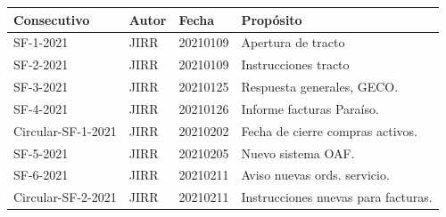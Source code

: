 \documentclass[12pt]{article}
\begin{document}
    

\begin{table}[]
\centering
\begin{tabular}{@{}llll@{}}
\toprule
Consecutivo & Autor & Fecha & Propósito \\ 
\midrule
      SF-1-2021      &JIRR     &20210109       &Apertura de tracto \\
      SF-2-2021      &JIRR     &20210109       &Instrucciones tracto \\ 
      SF-3-2021      &JIRR     &20210125       &Respuesta generales, GECO. \\ 
      SF-4-2021      &JIRR     &20210126       &Informe facturas Paraíso. \\ 
      Circular-SF-1-2021      &JIRR     &20210202       &Fecha de cierre compras activos. \\ 
      SF-5-2021      &JIRR     &20210205 &Nuevo sistema OAF. \\ 
      SF-6-2021      &JIRR     &20210211 &Aviso nuevas ords. servicio. \\ 
      Circular-SF-2-2021      &JIRR     &20210211       &Instrucciones nuevas para facturas. \\ 
      \bottomrule
\end{tabular}
\end{table}
\end{document}
